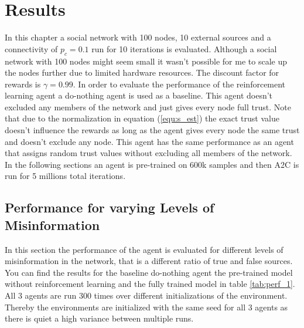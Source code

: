 \documentclass[11pt, a4paper]{article}
\begin{document}
\section{Results}
In this chapter a social network with 100 nodes, 10 external sources and a connectivity of $p_c=0.1$ run for 10 iterations is evaluated. Although a social network with 100 nodes might seem small it wasn't possible for me to scale up the nodes further due to limited hardware resources. The discount factor for rewards is $\gamma=0.99$. In order to evaluate the performance of the reinforcement learning agent a do-nothing agent is used as a baseline. This agent doesn't excluded any members of the network and just gives every node full trust. Note that due to the normalization in equation (\ref{equ:s_est}) the exact trust value doesn't influence the rewards as long as the agent gives every node the same trust and doesn't exclude any node. This agent has the same performance as an agent that assigns random trust values without excluding all members of the network. \newline
In the following sections an agent is pre-trained on 600k samples and then A2C is run for 5 millions total iterations.

\subsection{Performance for varying Levels of Misinformation}
In this section the performance of the agent is evaluated for different levels of misinformation in the network, that is a different ratio of true and false sources. You can find the results for the baseline do-nothing agent the pre-trained model without reinforcement learning and the fully trained model in table \ref{tab:perf_1}. All 3 agents are run 300 times over different initializations of the environment. Thereby the environments are initialized with the same seed for all 3 agents as there is quiet a high variance between multiple runs.
\end{document}
